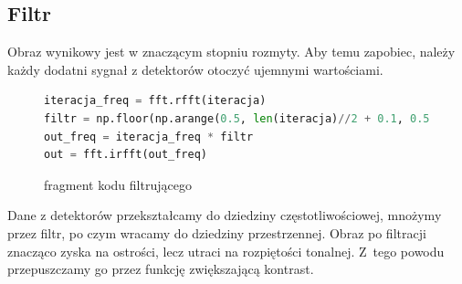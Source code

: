 \documentclass[polish,polish,a4paper]{article}
\begin{document}
				\subsection{Filtr}
					Obraz wynikowy jest w znaczącym stopniu rozmyty.
					Aby temu zapobiec, należy każdy dodatni sygnał z detektorów otoczyć ujemnymi wartościami.
					\begin{figure}[!h]
					\centering
						\begin{lstlisting}[language=Python, frame=single]
iteracja_freq = fft.rfft(iteracja)
filtr = np.floor(np.arange(0.5, len(iteracja)//2 + 0.1, 0.5 ))
out_freq = iteracja_freq * filtr
out = fft.irfft(out_freq)
						\end{lstlisting}
						\caption{fragment kodu filtrującego}
				\end{figure}
					
					Dane z detektorów przekształcamy do dziedziny częstotliwościowej,
					 mnożymy przez filtr, 
					 po czym wracamy do dziedziny przestrzennej.
					Obraz po filtracji znacząco zyska na ostrości, lecz utraci na rozpiętości tonalnej.
					Z~tego powodu przepuszczamy go przez funkcję zwiększającą kontrast.
					
\end{document}
